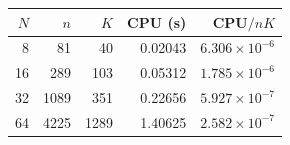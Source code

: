 \begin{tabular}{rrrrr}
\toprule
$N$ & $n$ & $K$ & CPU (s) & CPU$/nK$ \\
\midrule
8 & 81 & 40 & 0.02043 & $6.306\times10^{-6}$ \\
16 & 289 & 103 & 0.05312 & $1.785\times10^{-6}$ \\
32 & 1089 & 351 & 0.22656 & $5.927\times10^{-7}$ \\
64 & 4225 & 1289 & 1.40625 & $2.582\times10^{-7}$ \\
\bottomrule
\end{tabular}
